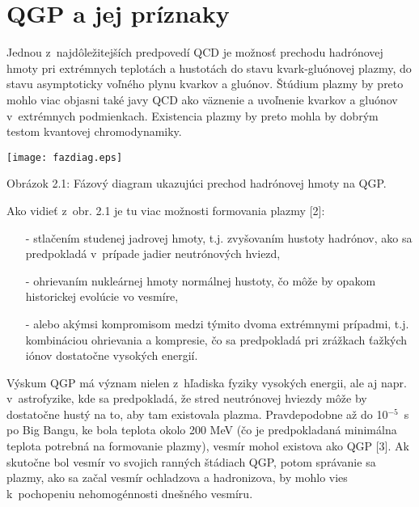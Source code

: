 \chapter{QGP a jej príznaky}
Jednou z~najdôležitejších predpovedí QCD je možnosť
prechodu hadrónovej hmo\-ty pri extrémnych teplotách a hustotách
do stavu kvark-gluónovej plazmy, do stavu asymptoticky voľného
plynu kvarkov a gluónov. Štúdium plazmy by preto mohlo viac
objasni\softt{} také javy QCD ako väznenie a uvoľnenie
kvarkov  a gluónov v~extrémnych podmienkach. Existencia
plazmy by preto mohla by\softt{} dobrým testom kvantovej chromodynamiky.

\begin{center}
  \texttt{[image: fazdiag.eps]}
\end{center}

\begin{center}
  Obrázok 2.1: Fázový diagram ukazujúci prechod hadrónovej hmoty na QGP.
\end{center}
\newpage
Ako vidieť z~obr. 2.1 je tu viac možnosti formovania plazmy [2]:

\begin{itemize}
\item[-] stlačením studenej jadrovej hmoty, t.j. zvyšovaním
  hustoty hadrónov, ako sa predpokladá  v~prípade  jadier neutrónových
  hviezd,
\item[-] ohrievaním nukleárnej hmoty normálnej hustoty,  čo
  môže by\softt{} opakom historickej  evolúcie vo vesmíre,
\item[-] alebo akýmsi kompromisom medzi týmito dvoma extrémnymi
  prípadmi, t.j. kombináciou ohrievania a kompresie, čo sa
  predpokladá pri zrážkach ťažkých iónov dostatočne vysokých
  energií.
\end{itemize}

Výskum QGP má význam nielen z~hľadiska fyziky vysokých energii,
ale aj napr. v~astrofyzike, kde sa predpokladá, že stred neutrónovej
hviezdy môže  by\softt{} dostatočne hustý na to, aby tam existovala
plazma. Pravdepodobne až do 10$^{-5}$~s po Big Bangu, ke\softd{} bola
teplota okolo 200 MeV (čo je predpokladaná minimálna teplota
potrebná na formovanie plazmy), vesmír mohol existova\softt{} ako QGP
[3]. Ak  skutočne bol vesmír vo svojich ranných
štádiach QGP, potom správanie sa  plazmy, ako sa začal vesmír
ochladzova\softt{} a hadronizova\softt{}, by mohlo vies\softt{}  k~pochopeniu
nehomogénnosti dnešného vesmíru.

